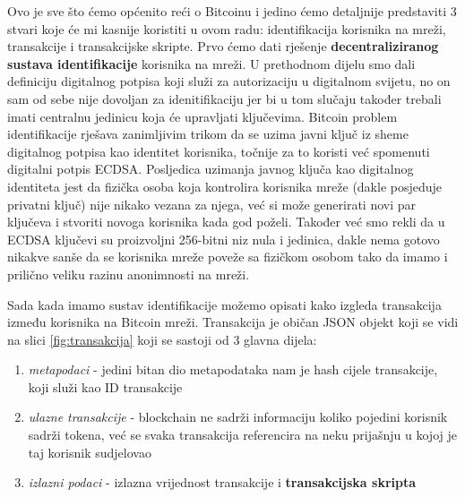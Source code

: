 \documentclass[a4paper,oneside,12pt]{memoir} %
\begin{document}
Ovo je sve što ćemo općenito reći o Bitcoinu i jedino ćemo detaljnije predstaviti 3 stvari koje će mi kasnije koristiti u ovom radu: identifikacija korisnika na mreži, transakcije i transakcijske skripte. Prvo ćemo dati rješenje \textbf{decentraliziranog sustava identifikacije} korisnika na mreži. U prethodnom dijelu smo dali definiciju digitalnog potpisa koji služi za autorizaciju u digitalnom svijetu, no on sam od sebe nije dovoljan za idenitifikaciju jer bi u tom slučaju također trebali imati centralnu jedinicu koja će upravljati ključevima. Bitcoin problem identifikacije rješava zanimljivim trikom da se uzima javni ključ iz sheme digitalnog potpisa kao identitet korisnika, točnije za to koristi već spomenuti digitalni potpis ECDSA. Posljedica uzimanja javnog ključa kao digitalnog identiteta jest da fizička osoba koja kontrolira korisnika mreže (dakle posjeduje privatni ključ) nije nikako vezana za njega, već si može generirati novi par ključeva i stvoriti novoga korisnika kada god poželi. Također već smo rekli da u ECDSA ključevi su proizvoljni 256-bitni niz nula i jedinica, dakle nema gotovo nikakve sanše da se korisnika mreže poveže sa fizičkom osobom tako da imamo i prilično veliku razinu anonimnosti na mreži.

Sada kada imamo sustav identifikacije možemo opisati kako izgleda transakcija između korisnika na Bitcoin mreži. Transakcija je običan JSON objekt koji se vidi na slici \ref{fig:transakcija} koji se sastoji od 3 glavna dijela:
\begin{enumerate}
    \item \textit{metapodaci} - jedini bitan dio metapodataka nam je hash cijele transakcije, koji služi kao ID transakcije
    \item\textit{ulazne transakcije} - blockchain ne sadrži informaciju koliko pojedini korisnik sadrži tokena, već se svaka transakcija referencira na neku prijašnju u kojoj je taj korisnik sudjelovao
    \item \textit{izlazni podaci} - izlazna vrijednost transakcije i \textbf{transakcijska skripta}
\end{enumerate}
\end{document}
